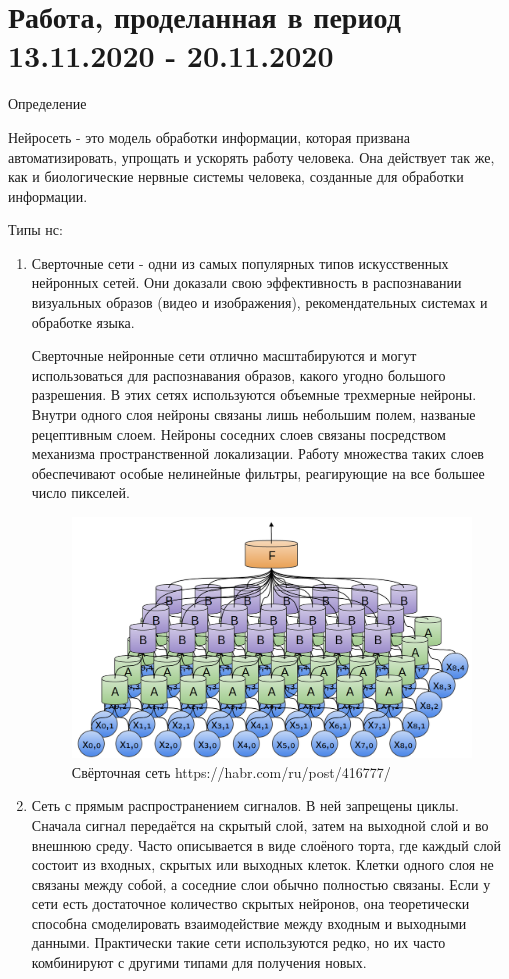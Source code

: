 \documentclass[12pt,a4paper]{report}
\begin{document}
	\section{Работа, проделанная в период 13.11.2020 - 20.11.2020}
	Определение 

Нейросеть  - это модель обработки информации, которая призвана автоматизировать, упрощать и ускорять работу человека. Она действует так же, как и биологические нервные системы человека, созданные для обработки информации. 

 Типы нс: 

\begin{enumerate}
\item Сверточные сети - одни из самых популярных типов искусственных нейронных сетей. Они доказали свою эффективность в распознавании визуальных образов (видео и изображения), рекомендательных системах и обработке языка.

Сверточные нейронные сети отлично масштабируются и могут использоваться для распознавания образов, какого угодно большого разрешения.
В этих сетях используются объемные трехмерные нейроны. Внутри одного слоя нейроны связаны лишь небольшим полем, названые рецептивным слоем.
Нейроны соседних слоев связаны посредством механизма пространственной локализации. Работу множества таких слоев обеспечивают особые нелинейные фильтры, реагирующие на все большее число пикселей.

\begin{figure}
	\centering
	\includegraphics[width=\columnwidth]{sv}
	\caption{Свёрточная сеть
	https://habr.com/ru/post/416777/}
\end{figure}

\item Сеть с прямым распространением сигналов. В ней запрещены циклы. Сначала сигнал передаётся на скрытый слой, затем на выходной слой и во внешнюю среду. Часто описывается в виде слоёного торта, где каждый слой состоит из входных, скрытых или выходных клеток. Клетки одного слоя не связаны между собой, а соседние слои обычно полностью связаны. Если у сети есть достаточное количество скрытых нейронов, она теоретически способна смоделировать взаимодействие между входным и выходными данными. Практически такие сети используются редко, но их часто комбинируют с другими типами для получения новых.


\end{enumerate}
\end{document}
